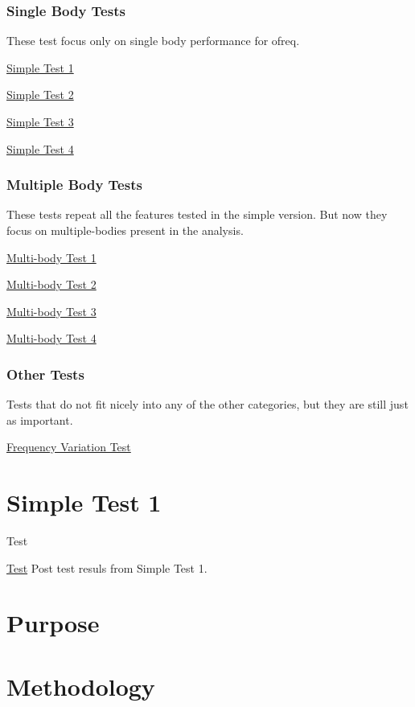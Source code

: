 \subsubsection*{Single Body Tests}

These test focus only on single body performance for ofreq.

\hyperlink{SimpleTest1}{Simple Test 1}

\hyperlink{SimpleTest2}{Simple Test 2}

\hyperlink{SimpleTest3}{Simple Test 3}

\hyperlink{SimpleTest4}{Simple Test 4}

\subsubsection*{Multiple Body Tests}

These tests repeat all the features tested in the simple version. But now they focus on multiple-\/bodies present in the analysis.

\hyperlink{MultiBodyTest1}{Multi-\/body Test 1}

\hyperlink{MultiBodyTest2}{Multi-\/body Test 2}

\hyperlink{MultiBodyTest3}{Multi-\/body Test 3}

\hyperlink{MultiBodyTest4}{Multi-\/body Test 4}

\subsubsection*{Other Tests}

Tests that do not fit nicely into any of the other categories, but they are still just as important.

\hyperlink{TestFrequency}{Frequency Variation Test} \hypertarget{SimpleTest1}{}\section{Simple Test 1}\label{SimpleTest1}
\begin{DoxyRefDesc}{Test}
\item[\hyperlink{test__test000005}{Test}]Post test resuls from Simple Test 1.\end{DoxyRefDesc}


\section*{Purpose}

\section*{Methodology}

